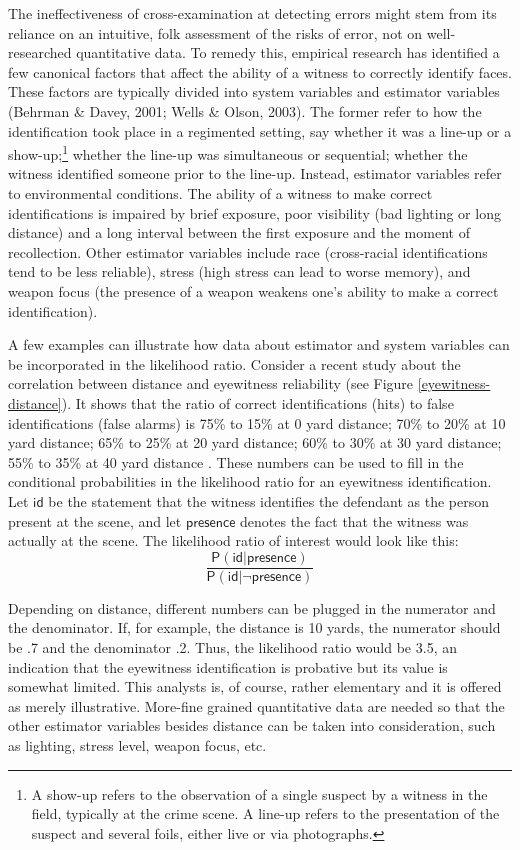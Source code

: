 \documentclass[
  10pt,
  dvipsnames,enabledeprecatedfontcommands]{scrartcl}
\newcommand{\pr}[1]{\mathsf{P}(#1)}
\begin{document}
The ineffectiveness of cross-examination at detecting errors might stem
from its reliance on an intuitive, folk assessment of the risks of
error, not on well-researched quantitative data. To remedy this,
empirical research has identified a few canonical factors that affect
the ability of a witness to correctly identify faces. These factors are
typically divided into system variables and estimator variables (Behrman
\& Davey, 2001; Wells \& Olson, 2003). The former refer to how the
identification took place in a regimented setting, say whether it was a
line-up or a
show-up;\footnote{A show-up refers to the observation of a single suspect by a witness in the field, typically at the crime scene. A line-up refers to the presentation of the suspect and several foils, either live or via photographs.}
whether the line-up was simultaneous or sequential; whether the witness
identified someone prior to the line-up. Instead, estimator variables
refer to environmental conditions. The ability of a witness to make
correct identifications is impaired by brief exposure, poor visibility
(bad lighting or long distance) and a long interval between the first
exposure and the moment of recollection. Other estimator variables
include race (cross-racial identifications tend to be less reliable),
stress (high stress can lead to worse memory), and weapon focus (the
presence of a weapon weakens one's ability to make a correct
identification).

A few examples can illustrate how data about estimator and system
variables can be incorporated in the likelihood ratio. Consider a recent
study about the correlation between distance and eyewitness reliability
(see Figure \ref{eyewitness-distance}). It shows that the ratio of
correct identifications (hits) to false identifications (false alarms)
is 75\% to 15\% at 0 yard distance; 70\% to 20\% at 10 yard distance;
65\% to 25\% at 20 yard distance; 60\% to 30\% at 30 yard distance; 55\%
to 35\% at 40 yard distance \citep{lampinen2014}. 
These numbers can be used to fill in the conditional probabilities in
the likelihood ratio for an eyewitness identification. Let
\(\textsf{id}\) be the statement that the witness identifies the
defendant as the person present at the scene, and let
\(\textsf{presence}\) denotes the fact that the witness was actually at
the scene. The likelihood ratio of interest would look like this:
\[\frac{\pr{\textsf{id} \vert \textsf{presence}}}{\pr{\textsf{id} \vert \neg \textsf{presence}}}\]

\noindent Depending on distance, different numbers can be plugged in the
numerator and the denominator. If, for example, the distance is 10
yards, the numerator should be .7 and the denominator .2. Thus, the
likelihood ratio would be 3.5, an indication that the eyewitness
identification is probative but its value is somewhat limited. This
analysts is, of course, rather elementary and it is offered as merely
illustrative. More-fine grained quantitative data are needed so that the
other estimator variables besides distance can be taken into
consideration, such as lighting, stress level, weapon focus, etc.
\end{document}

